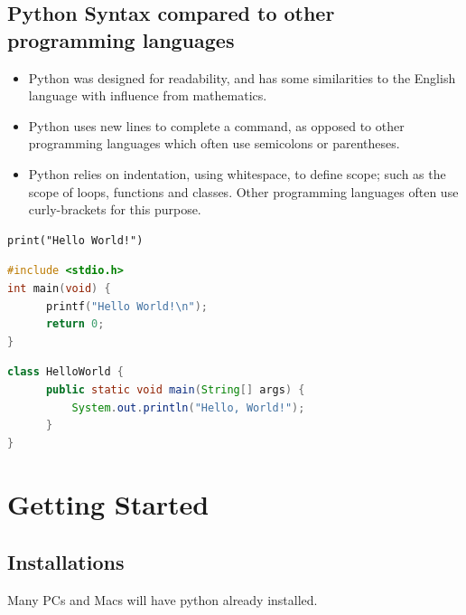 \documentclass[12pt,a4paper]{article}
\begin{document}
\subsection{Python Syntax compared to other programming languages}

\begin{itemize}
	\item Python was designed for readability, and has some similarities to the English language with influence from mathematics.
	\item Python uses new lines to complete a command, as opposed to other programming languages which often use semicolons or parentheses.
	\item Python relies on indentation, using whitespace, to define scope; such as the scope of loops, functions and classes. Other programming languages often use curly-brackets for this purpose.
\end{itemize}

\begin{tcb}[Python]
\begin{lstlisting}[numbers=none,xrightmargin=0mm,xleftmargin=0mm,frame=none]
print("Hello World!")
\end{lstlisting}
\end{tcb}

\begin{tcb}[C]
\begin{lstlisting}[language=c,numbers=none,xrightmargin=0mm,xleftmargin=0mm,frame=none]
#include <stdio.h>
int main(void) {
      printf("Hello World!\n");
      return 0;
}
\end{lstlisting}
\end{tcb}

\begin{tcb}[Java]
\begin{lstlisting}[language=Java,numbers=none,xrightmargin=0mm,xleftmargin=0mm,frame=none]
class HelloWorld {
      public static void main(String[] args) {
          System.out.println("Hello, World!");
      }
}
\end{lstlisting}
\end{tcb}
\vfill\newpage
\section{Getting Started}
\subsection{Installations}
Many PCs and Macs will have python already installed.
\end{document}
